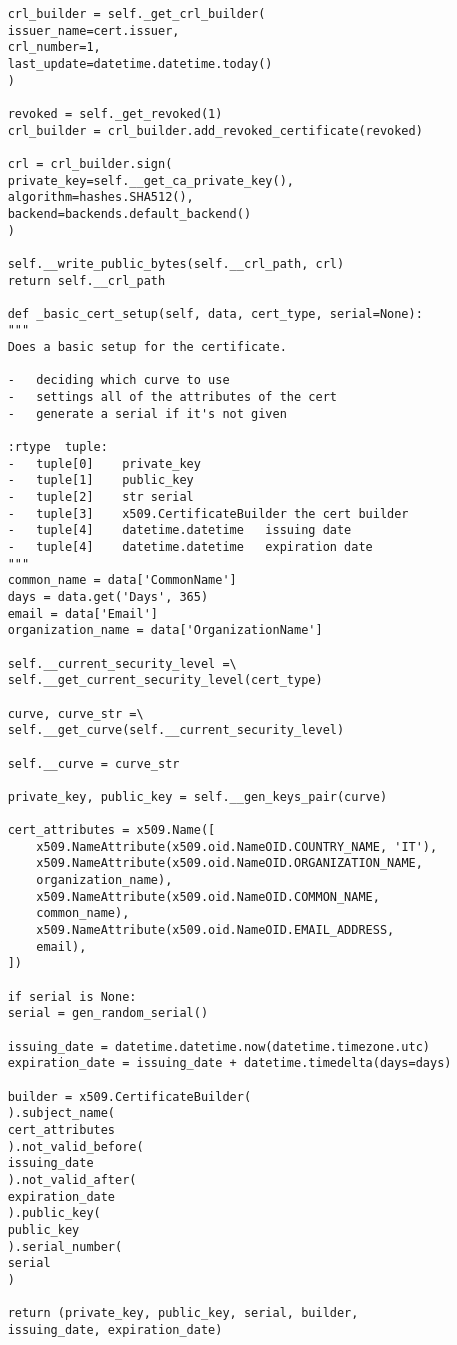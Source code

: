 \begin{verbatim}
	crl_builder = self._get_crl_builder(
	issuer_name=cert.issuer,
	crl_number=1,
	last_update=datetime.datetime.today()
	)
	
	revoked = self._get_revoked(1)
	crl_builder = crl_builder.add_revoked_certificate(revoked)
	
	crl = crl_builder.sign(
	private_key=self.__get_ca_private_key(),
	algorithm=hashes.SHA512(),
	backend=backends.default_backend()
	)
	
	self.__write_public_bytes(self.__crl_path, crl)
	return self.__crl_path
	
	def _basic_cert_setup(self, data, cert_type, serial=None):
	"""
	Does a basic setup for the certificate.
	
	-   deciding which curve to use
	-   settings all of the attributes of the cert
	-   generate a serial if it's not given
	
	:rtype  tuple:
	-   tuple[0]    private_key
	-   tuple[1]    public_key
	-   tuple[2]    str serial
	-   tuple[3]    x509.CertificateBuilder the cert builder
	-   tuple[4]    datetime.datetime   issuing date
	-   tuple[4]    datetime.datetime   expiration date
	"""
	common_name = data['CommonName']
	days = data.get('Days', 365)
	email = data['Email']
	organization_name = data['OrganizationName']
	
	self.__current_security_level =\
	self.__get_current_security_level(cert_type)
	
	curve, curve_str =\
	self.__get_curve(self.__current_security_level)
	
	self.__curve = curve_str
	
	private_key, public_key = self.__gen_keys_pair(curve)
	
	cert_attributes = x509.Name([
		x509.NameAttribute(x509.oid.NameOID.COUNTRY_NAME, 'IT'),
		x509.NameAttribute(x509.oid.NameOID.ORGANIZATION_NAME,
		organization_name),
		x509.NameAttribute(x509.oid.NameOID.COMMON_NAME,
		common_name),
		x509.NameAttribute(x509.oid.NameOID.EMAIL_ADDRESS,
		email),
	])
	
	if serial is None:
	serial = gen_random_serial()
	
	issuing_date = datetime.datetime.now(datetime.timezone.utc)
	expiration_date = issuing_date + datetime.timedelta(days=days)
	
	builder = x509.CertificateBuilder(
	).subject_name(
	cert_attributes
	).not_valid_before(
	issuing_date
	).not_valid_after(
	expiration_date
	).public_key(
	public_key
	).serial_number(
	serial
	)
	
	return (private_key, public_key, serial, builder,
	issuing_date, expiration_date)        
	

\end{verbatim}
